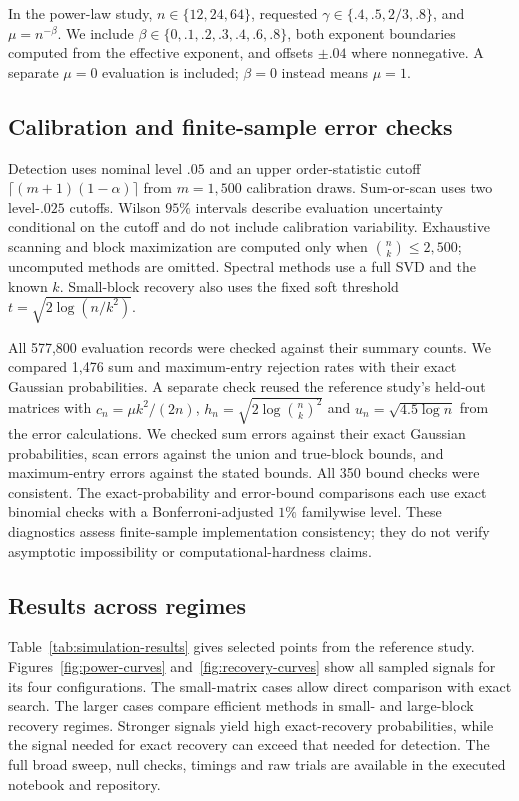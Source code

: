 In the power-law study, $n\in\{12,24,64\}$, requested
$\gamma\in\{.4,.5,2/3,.8\}$, and $\mu=n^{-\beta}$.
We include $\beta\in\{0,.1,.2,.3,.4,.6,.8\}$, both exponent boundaries
computed from the effective exponent, and offsets $\pm.04$ where nonnegative.
A separate $\mu=0$ evaluation is included; $\beta=0$ instead means $\mu=1$.

\subsection{Calibration and finite-sample error checks}
Detection uses nominal level $.05$ and an upper order-statistic cutoff
$\lceil(m+1)(1-\alpha)\rceil$ from $m=1{,}500$ calibration draws.
Sum-or-scan uses two level-$.025$ cutoffs. Wilson $95\%$ intervals describe
evaluation uncertainty conditional on the cutoff and do not include
calibration variability. Exhaustive scanning and block maximization are
computed only when $\binom nk\leq2{,}500$; uncomputed methods are omitted.
Spectral methods use a full SVD and the known $k$. Small-block recovery also
uses the fixed soft threshold $t=\sqrt{2\log(n/k^2)}$.

All 577,800 evaluation records were checked against their summary counts. We compared 1,476 sum and maximum-entry rejection rates with their exact Gaussian probabilities. A separate check reused the reference study's held-out matrices with
$c_n=\mu k^2/(2n)$, $h_n=\sqrt{2\log\binom nk^2}$ and
$u_n=\sqrt{4.5\log n}$ from the error calculations. We checked sum errors
against their exact Gaussian probabilities, scan errors against the union
and true-block bounds, and maximum-entry errors against the stated bounds.
All 350 bound checks were consistent. The exact-probability and error-bound comparisons each use
exact binomial checks with a Bonferroni-adjusted $1\%$ familywise level.
These diagnostics assess finite-sample implementation consistency; they do
not verify asymptotic impossibility or computational-hardness claims.

\subsection{Results across regimes}
Table~\ref{tab:simulation-results} gives selected points from the reference
study. Figures~\ref{fig:power-curves} and~\ref{fig:recovery-curves} show all
sampled signals for its four configurations. The small-matrix cases allow
direct comparison with exact search. The larger cases compare efficient
methods in small- and large-block recovery regimes. Stronger signals yield
high exact-recovery probabilities, while the signal needed for exact recovery
can exceed that needed for detection. The full broad sweep, null checks,
timings and raw trials are available in the executed notebook and repository.

